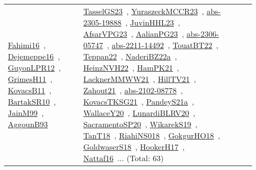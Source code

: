 {\begin{longtable}{lp{3cm}>{\raggedright\arraybackslash}p{6cm}>{\raggedright\arraybackslash}p{6cm}>{\raggedright\arraybackslash}p{8cm}}
\href{../works/Fahimi16.pdf}{Fahimi16}~\cite{Fahimi16}, \href{../works/Dejemeppe16.pdf}{Dejemeppe16}~\cite{Dejemeppe16}, \href{../works/GuyonLPR12.pdf}{GuyonLPR12}~\cite{GuyonLPR12}, \href{../works/GrimesH11.pdf}{GrimesH11}~\cite{GrimesH11}, \href{../works/KovacsB11.pdf}{KovacsB11}~\cite{KovacsB11}, \href{../works/BartakSR10.pdf}{BartakSR10}~\cite{BartakSR10}, \href{../works/JainM99.pdf}{JainM99}~\cite{JainM99}, \href{../works/AggounB93.pdf}{AggounB93}~\cite{AggounB93} & \href{../works/TasselGS23.pdf}{TasselGS23}~\cite{TasselGS23}, \href{../works/YuraszeckMCCR23.pdf}{YuraszeckMCCR23}~\cite{YuraszeckMCCR23}, \href{../works/abs-2305-19888.pdf}{abs-2305-19888}~\cite{abs-2305-19888}, \href{../works/JuvinHHL23.pdf}{JuvinHHL23}~\cite{JuvinHHL23}, \href{../works/AfsarVPG23.pdf}{AfsarVPG23}~\cite{AfsarVPG23}, \href{../works/AalianPG23.pdf}{AalianPG23}~\cite{AalianPG23}, \href{../works/abs-2306-05747.pdf}{abs-2306-05747}~\cite{abs-2306-05747}, \href{../works/abs-2211-14492.pdf}{abs-2211-14492}~\cite{abs-2211-14492}, \href{../works/TouatBT22.pdf}{TouatBT22}~\cite{TouatBT22}, \href{../works/Teppan22.pdf}{Teppan22}~\cite{Teppan22}, \href{../works/NaderiBZ22a.pdf}{NaderiBZ22a}~\cite{NaderiBZ22a}, \href{../works/HeinzNVH22.pdf}{HeinzNVH22}~\cite{HeinzNVH22}, \href{../works/HamPK21.pdf}{HamPK21}~\cite{HamPK21}, \href{../works/LacknerMMWW21.pdf}{LacknerMMWW21}~\cite{LacknerMMWW21}, \href{../works/HillTV21.pdf}{HillTV21}~\cite{HillTV21}, \href{../works/Zahout21.pdf}{Zahout21}~\cite{Zahout21}, \href{../works/abs-2102-08778.pdf}{abs-2102-08778}~\cite{abs-2102-08778}, \href{../works/KovacsTKSG21.pdf}{KovacsTKSG21}~\cite{KovacsTKSG21}, \href{../works/PandeyS21a.pdf}{PandeyS21a}~\cite{PandeyS21a}, \href{../works/WallaceY20.pdf}{WallaceY20}~\cite{WallaceY20}, \href{../works/LunardiBLRV20.pdf}{LunardiBLRV20}~\cite{LunardiBLRV20}, \href{../works/SacramentoSP20.pdf}{SacramentoSP20}~\cite{SacramentoSP20}, \href{../works/WikarekS19.pdf}{WikarekS19}~\cite{WikarekS19}, \href{../works/TanT18.pdf}{TanT18}~\cite{TanT18}, \href{../works/RiahiNS018.pdf}{RiahiNS018}~\cite{RiahiNS018}, \href{../works/GokgurHO18.pdf}{GokgurHO18}~\cite{GokgurHO18}, \href{../works/GoldwaserS18.pdf}{GoldwaserS18}~\cite{GoldwaserS18}, \href{../works/HookerH17.pdf}{HookerH17}~\cite{HookerH17}, \href{../works/Nattaf16.pdf}{Nattaf16}~\cite{Nattaf16}... (Total: 63)\\

\end{longtable}}
